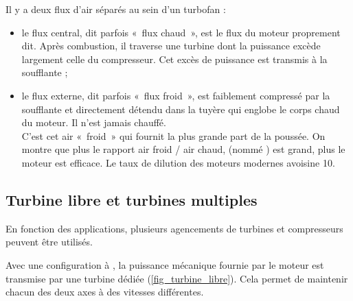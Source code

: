 		Il y a deux flux d’air séparés au sein d’un turbofan :

		\begin{itemize}
			\item le flux central, dit parfois «~flux chaud~», est le flux du moteur proprement dit. Après combustion, il traverse une turbine dont la puissance excède largement celle du compresseur. Cet excès de puissance est transmis à la soufflante ;
			\item le flux externe, dit parfois «~flux froid~», est faiblement compressé par la soufflante et directement détendu dans la tuyère qui englobe le corps chaud du moteur. Il n’est jamais chauffé.\\
			C’est cet air «~froid~» qui fournit la plus grande part de la poussée. On montre que plus le rapport air froid / air chaud, (nommé ) est grand, plus le moteur est efficace. Le taux de dilution des moteurs modernes avoisine \num{10}.
		\end{itemize}
		 

	\subsection{Turbine libre et turbines multiples}

		En fonction des applications, plusieurs agencements de turbines et compresseurs peuvent être utilisés.

		Avec une configuration à , la puissance mécanique fournie par le moteur est transmise par une turbine dédiée (\cref{fig_turbine_libre}). Cela permet de maintenir chacun des deux axes à des vitesses différentes.

